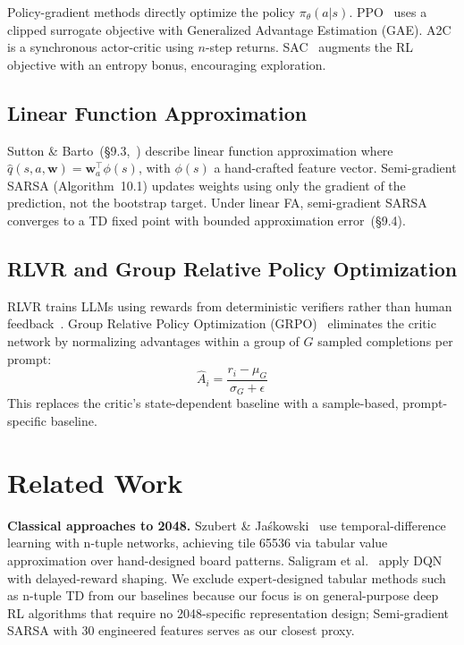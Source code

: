 \documentclass[letterpaper]{article}
\begin{document}
Policy-gradient methods directly optimize the policy $\pi_\theta(a|s)$. PPO~\cite{schulman2017proximal} uses a clipped surrogate objective with Generalized Advantage Estimation (GAE). A2C~\cite{mnih2016asynchronous} is a synchronous actor-critic using $n$-step returns. SAC~\cite{haarnoja2018soft} augments the RL objective with an entropy bonus, encouraging exploration.

\subsection{Linear Function Approximation}

Sutton \& Barto~(\S9.3,~\cite{sutton2018rl}) describe linear function approximation where $\hat{q}(s,a,\mathbf{w}) = \mathbf{w}_a^\top\phi(s)$, with $\phi(s)$ a hand-crafted feature vector. Semi-gradient SARSA (Algorithm~10.1) updates weights using only the gradient of the prediction, not the bootstrap target. Under linear FA, semi-gradient SARSA converges to a TD fixed point with bounded approximation error~(\S9.4).

\subsection{RLVR and Group Relative Policy Optimization}

RLVR trains LLMs using rewards from deterministic verifiers rather than human feedback~\cite{guo2025deepseek}. Group Relative Policy Optimization (GRPO)~\cite{shao2024deepseekmath} eliminates the critic network by normalizing advantages within a group of $G$ sampled completions per prompt:
\begin{equation}
    \hat{A}_i = \frac{r_i - \mu_G}{\sigma_G + \epsilon}
    \label{eq:grpo_adv}
\end{equation}
This replaces the critic's state-dependent baseline with a sample-based, prompt-specific baseline.

\section{Related Work}
\label{sec:related}

\textbf{Classical approaches to 2048.}
Szubert \& Ja\'skowski~\cite{szubert2014temporal} use temporal-difference learning with n-tuple networks, achieving tile 65536 via tabular value approximation over hand-designed board patterns. Saligram et al.~\cite{saligram2025delayed} apply DQN with delayed-reward shaping. We exclude expert-designed tabular methods such as n-tuple TD from our baselines because our focus is on general-purpose deep RL algorithms that require no 2048-specific representation design; Semi-gradient SARSA with 30 engineered features serves as our closest proxy.
\end{document}
